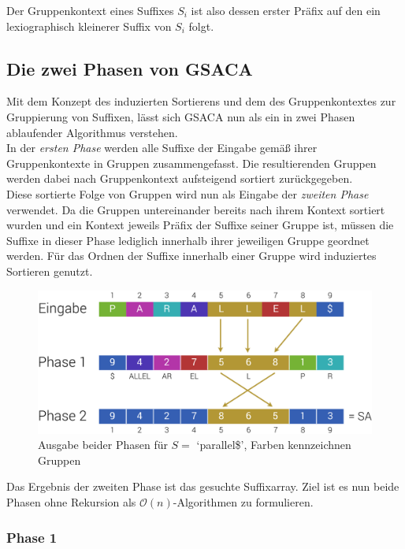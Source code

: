 \documentclass[twoside,11pt]{article}
\theoremstyle{break}
\begin{document}
Der Gruppenkontext eines Suffixes $S_i$ ist also dessen erster Präfix auf den ein lexiographisch kleinerer Suffix von $S_i$ folgt.

\subsection{Die zwei Phasen von GSACA}

Mit dem Konzept des induzierten Sortierens und dem des Gruppenkontextes zur Gruppierung von Suffixen, lässt sich GSACA nun als ein in zwei Phasen ablaufender Algorithmus verstehen. \\

In der \textit{ersten Phase} werden alle Suffixe der Eingabe gemäß ihrer Gruppenkontexte in Gruppen zusammengefasst. Die resultierenden Gruppen werden dabei nach Gruppenkontext aufsteigend sortiert zurückgegeben. \\

Diese sortierte Folge von Gruppen wird nun als Eingabe der \textit{zweiten Phase} verwendet. Da die Gruppen untereinander bereits nach ihrem Kontext sortiert wurden und ein Kontext jeweils Präfix der Suffixe seiner Gruppe ist, müssen die Suffixe in dieser Phase lediglich innerhalb ihrer jeweiligen Gruppe geordnet werden. Für das Ordnen der Suffixe innerhalb einer Gruppe wird induziertes Sortieren genutzt.

\begin{figure}[h]
	\centering
	\includegraphics[width=0.7\linewidth,bb=0 0 874 376]{./assets/twoPhases.pdf}
	\caption{Ausgabe beider Phasen für $S =$ `parallel\$', Farben kennzeichnen Gruppen}
\label{fig:twoPhases}
\end{figure}

Das Ergebnis der zweiten Phase ist das gesuchte Suffixarray. Ziel ist es nun beide Phasen ohne Rekursion als $\mathcal{O}(n)$-Algorithmen zu formulieren.

\subsubsection{Phase 1}
\end{document}
